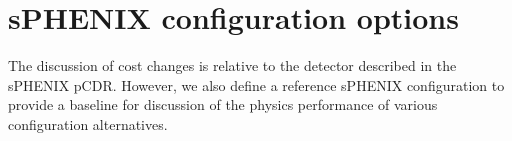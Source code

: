 \chapter*{sPHENIX configuration options}
\label{configurations}
\setcounter{page}{1}

The discussion of cost changes is relative to the detector described
in the sPHENIX pCDR.  However, we also define a reference sPHENIX
configuration to provide a baseline for discussion of the physics
performance of various configuration alternatives.



